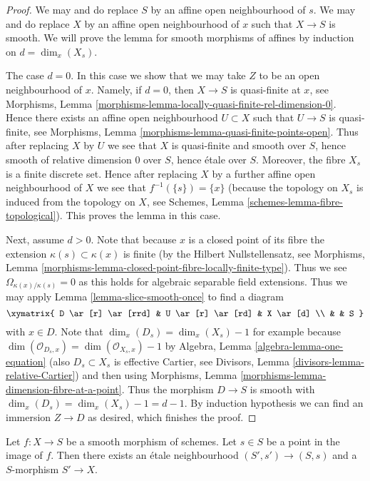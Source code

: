 \begin{proof}
We may and do replace $S$ by an affine open neighbourhood of $s$.
We may and do replace $X$ by an affine open neighbourhood of $x$
such that $X \to S$ is smooth.
We will prove the lemma for smooth morphisms of affines
by induction on $d = \dim_x(X_s)$.

\medskip\noindent
The case $d = 0$. In this case we show that we may take $Z$ to be
an open neighbourhood of $x$. Namely, if $d = 0$, then $X \to S$
is quasi-finite at $x$, see
Morphisms, Lemma \ref{morphisms-lemma-locally-quasi-finite-rel-dimension-0}.
Hence there exists an affine open neighbourhood $U \subset X$ such
that $U \to S$ is quasi-finite, see
Morphisms, Lemma \ref{morphisms-lemma-quasi-finite-points-open}.
Thus after replacing $X$ by $U$ we see that
$X$ is quasi-finite and smooth over $S$, hence
smooth of relative dimension $0$ over $S$, hence
\'etale over $S$. Moreover, the fibre $X_s$ is a finite
discrete set. Hence after replacing $X$ by a further affine open neighbourhood
of $X$ we see that $f^{-1}(\{s\}) = \{x\}$ (because the topology
on $X_s$ is induced from the topology on $X$, see
Schemes, Lemma \ref{schemes-lemma-fibre-topological}).
This proves the lemma in this case.

\medskip\noindent
Next, assume $d > 0$. Note that because $x$ is a closed point of its
fibre the extension $\kappa(s) \subset \kappa(x)$ is finite (by the
Hilbert Nullstellensatz, see
Morphisms, Lemma \ref{morphisms-lemma-closed-point-fibre-locally-finite-type}).
Thus we see $\Omega_{\kappa(x)/\kappa(s)} = 0$ as this holds for
algebraic separable field extensions.
Thus we may apply
Lemma \ref{lemma-slice-smooth-once}
to find a diagram
$$
\xymatrix{
D \ar[r] \ar[rrd] & U \ar[r] \ar[rd] & X \ar[d] \\
& & S
}
$$
with $x \in D$. Note that
$\dim_x(D_s) = \dim_x(X_s) - 1$ for example because
$\dim(\mathcal{O}_{D_s, x}) = \dim(\mathcal{O}_{X_s, x}) - 1$ by
Algebra, Lemma \ref{algebra-lemma-one-equation}
(also $D_s \subset X_s$ is effective Cartier, see
Divisors, Lemma \ref{divisors-lemma-relative-Cartier})
and then using
Morphisms, Lemma \ref{morphisms-lemma-dimension-fibre-at-a-point}.
Thus the morphism $D \to S$ is smooth with
$\dim_x(D_s) = \dim_x(X_s) - 1 = d - 1$. By induction hypothesis
we can find an immersion $Z \to D$ as desired, which finishes the proof.
\end{proof}

\begin{lemma}
\label{lemma-etale-nbhd-dominates-smooth}
Let $f : X \to S$ be a smooth morphism of schemes.
Let $s \in S$ be a point in the image of $f$.
Then there exists an \'etale neighbourhood $(S', s') \to (S, s)$
and a $S$-morphism $S' \to X$.
\end{lemma}

